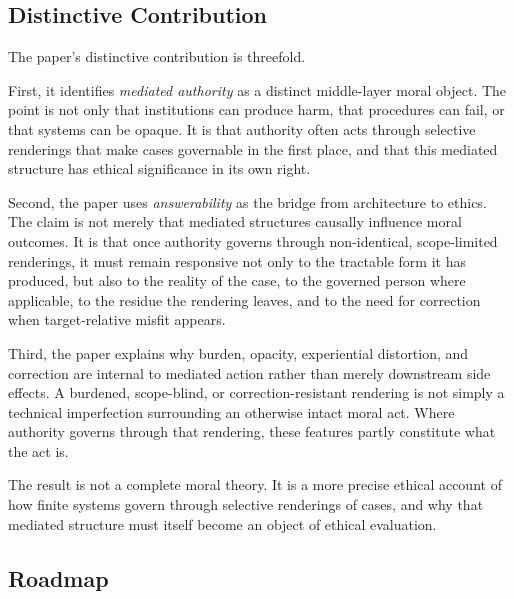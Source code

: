\documentclass[11pt]{article}
\renewcommand{\emph}[1]{\textit{#1}}
\begin{document}
\subsection{Distinctive Contribution}

The paper's distinctive contribution is threefold.

First, it identifies \emph{mediated authority} as a distinct middle-layer moral object. The point is not only that institutions can produce harm, that procedures can fail, or that systems can be opaque. It is that authority often acts through selective renderings that make cases governable in the first place, and that this mediated structure has ethical significance in its own right.

Second, the paper uses \emph{answerability} as the bridge from architecture to ethics. The claim is not merely that mediated structures causally influence moral outcomes. It is that once authority governs through non-identical, scope-limited renderings, it must remain responsive not only to the tractable form it has produced, but also to the reality of the case, to the governed person where applicable, to the residue the rendering leaves, and to the need for correction when target-relative misfit appears.

Third, the paper explains why burden, opacity, experiential distortion, and correction are internal to mediated action rather than merely downstream side effects. A burdened, scope-blind, or correction-resistant rendering is not simply a technical imperfection surrounding an otherwise intact moral act. Where authority governs through that rendering, these features partly constitute what the act is.

The result is not a complete moral theory. It is a more precise ethical account of how finite systems govern through selective renderings of cases, and why that mediated structure must itself become an object of ethical evaluation.

\subsection{Roadmap}
\end{document}
